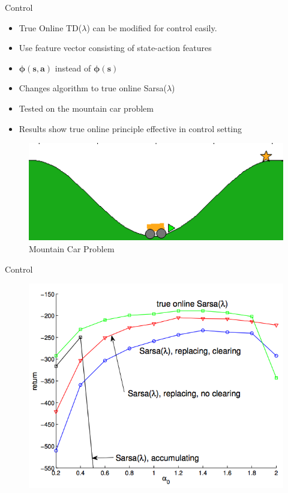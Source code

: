\documentclass[xcolor={table}]{beamer}
\begin{document}
\begin{frame}{Control}
    \begin{itemize}
        \item True Online TD($\lambda$) can be modified for control easily.
        \item Use feature vector consisting of state-action features
        \item $\boldsymbol{\phi(s,a)}$ instead of $\boldsymbol{\phi(s)}$
        \item Changes algorithm to true online Sarsa($\lambda$)
        \item Tested on the mountain car problem
        \item Results show true online principle effective in control setting
    \end{itemize}
    \begin{figure}
        \centering
        \includegraphics[scale = 0.4]{mountaincar.png}
        \caption{Mountain Car Problem}
        \label{fig:my_label}
    \end{figure}
\end{frame}

\begin{frame}{Control}
    \begin{figure}
        \centering
        \includegraphics[scale = 0.45]{fig4.png}
        \label{fig:my_label}
    \end{figure}
\end{frame}
\end{document}

